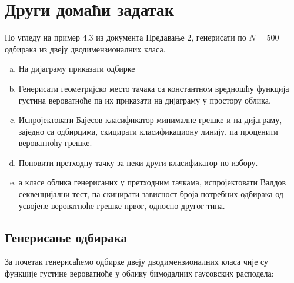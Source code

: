 \section{Други домаћи задатак}
По угледу на пример 4.3 из документа Предавање 2, генерисати по $N=500$ одбирака из двеју дводимензионалних класа.
\begin{enumerate}[a)]
\item На дијаграму приказати одбирке
\item Генерисати геометријско место тачака са константном вредношћу функција густина вероватноће па их приказати на дијаграму у простору облика.
\item Испројектовати Бајесов класификатор минималне грешке и на дијаграму, заједно са одбирцима, скицирати класификациону линију, па проценити вероватноћу грешке.
\item Поновити претходну тачку за неки други класификатор по избору.
\item а класе облика генерисаних у претходним тачкама, испројектовати Валдов секвенцијални тест, па скицирати зависност броја потребних одбирака од усвојене вероватноће грешке првог, односно другог типа.
\end{enumerate}

\subsection{Генерисање одбирака}

За почетак генерисаћемо одбирке двеју дводимензионалних класа чије су функције густине вероватноће у облику бимодалних гаусовских расподела:



